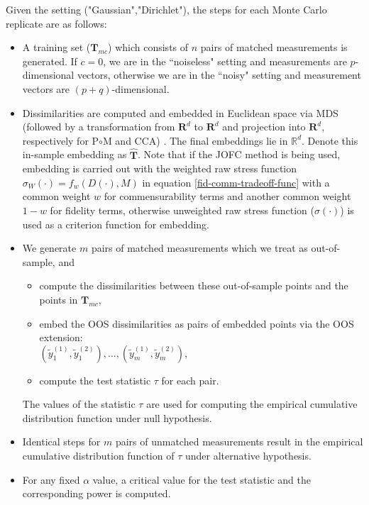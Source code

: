\documentclass[11pt]{article} %
\begin{document}
Given the setting ("Gaussian","Dirichlet"),   the steps for each Monte Carlo replicate are as follows:
\begin{itemize}
\item A training set ($\mathbf{T}_{mc}$) which consists of  $n$ pairs of matched measurements is generated.  If $c=0$, we are in the ``noiseless" setting and measurements are $p$-dimensional vectors, otherwise we are in the ``noisy" setting and measurement vectors are $(p+q)$-dimensional.
\item Dissimilarities are computed and embedded in  Euclidean space  via MDS (followed by a transformation from  $\mathbf{R}^d$ to  $\mathbf{R}^d$ and  projection into $\mathbf{R}^d$, respectively  for P$\circ$M and CCA) . The final embeddings lie in $\mathbb{R}^d$.   Denote this in-sample embedding as   $\hat{\mathbf{T}}$. Note that  if the JOFC method is being used, embedding is carried out with the weighted raw stress function $\sigma_{W}(\cdot)=f_{w}(D(\cdot),M)$ in equation \eqref{fid-comm-tradeoff-func} with a common weight $w$ for commensurability terms and another common weight $1-w$ for fidelity terms, otherwise unweighted raw stress function ($\sigma(\cdot)$) is used as a criterion function for embedding.

\item We generate $m$ pairs of matched   measurements  which we treat as out-of-sample, and 
\begin{itemize}
\item compute the dissimilarities  %
 between these out-of-sample  points and the points in ${\mathbf{T}_{mc}}$,  
\item  embed the OOS dissimilarities as pairs of embedded points via the OOS extension:\\
 $(\tilde{y}_1^{(1)},\tilde{y}_1^{(2)}),\ldots, (\tilde{y}_m^{(1)},\tilde{y}_m^{(2)})$, 
\item compute the test statistic $\tau$ for each pair.%
\end{itemize}
 The values of the statistic $\tau$ are used for computing  the empirical cumulative distribution function under null hypothesis. 

\item Identical steps for $m$ pairs of unmatched measurements result in the empirical cumulative distribution  function of $\tau$ under alternative hypothesis.
\item For any fixed $\alpha$ value, a critical value for the test statistic and the corresponding power is computed.
\end{itemize}
\end{document}
